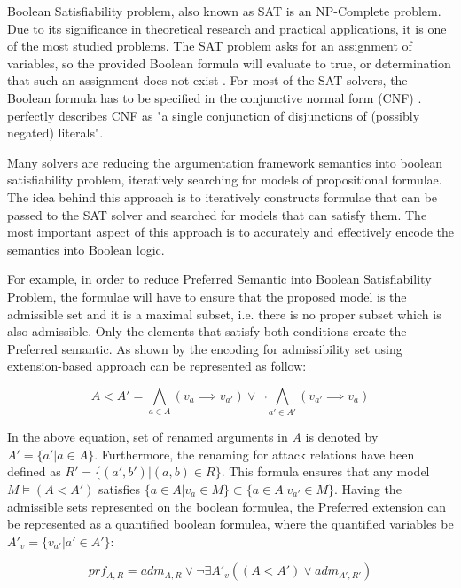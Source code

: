 Boolean Satisfiability problem, also known as SAT is an NP-Complete problem. Due to its significance in theoretical research and practical applications, it is one of the most studied problems. The SAT problem asks for an assignment of variables, so the provided Boolean formula will evaluate to true, or determination that such an assignment does not exist \citep{satSolver1}. For most of the SAT solvers, the Boolean formula has to be specified in the conjunctive normal form (CNF) \citep{SatSolver2}. \citet{cnfDefinition} perfectly describes CNF as "a single conjunction of disjunctions of (possibly negated) literals". 

Many solvers are reducing the argumentation framework semantics into boolean satisfiability problem, iteratively searching for models of propositional formulae. The idea behind this approach is to iteratively constructs formulae that can be passed to the SAT solver and searched for models that can satisfy them. The most important aspect of this approach is to accurately and effectively encode the semantics into Boolean logic. 

For example, in order to reduce Preferred Semantic into Boolean Satisfiability Problem, the formulae will have to ensure that the proposed model is the admissible set and it is a maximal subset, i.e. there is no proper subset which is also admissible. Only the elements that satisfy both conditions create the Preferred semantic. As shown by \citet{reasoningInArgumentationFr} the encoding for admissibility set using extension-based approach can be represented as follow:

\begin{equation}
A < A' = \bigwedge\limits_{a \in A} (v_a \implies v_{a'}) \lor \neg \bigwedge\limits_{a' \in A'} (v_{a'} \implies v_a)
\end{equation}

In the above equation, set of renamed arguments in \textit{A} is denoted by $A' = \{a' | a \in A\}$. Furthermore, the renaming for attack relations have been defined as $R' = \{(a',b') | (a,b) \in R\}$. This formula ensures that any model $ M \models (A < A')$ satisfies $ \{a \in A | v_a \in M\} \subset \{a \in A | v_{a'} \in M\} $. Having the admissible sets represented on the boolean formulea, the Preferred extension can be represented as a quantified boolean formulea, where the quantified variables be $ A'_v = \{v_{a'} | a' \in A'\} $:

\begin{equation}
prf_{A,R} = adm_{A,R} \lor \neg \exists A'_v ((A < A') \lor adm_{A',R'})
\end{equation}

